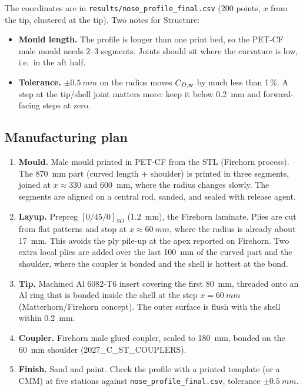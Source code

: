 The coordinates are in \texttt{results/nose\_profile\_final.csv} (200 points, $x$ from the tip,
clustered at the tip). Two notes for Structure:
\begin{itemize}[leftmargin=*,itemsep=2pt]
\item \textbf{Mould length.} The profile is longer than one print bed, so the PET-CF male mould
needs 2--3 segments. Joints should sit where the curvature is low, i.e.\ in the aft half.
\item \textbf{Tolerance.} $\pm\SI{0.5}{mm}$ on the radius moves $C_{D,\rm w}$ by much less than
1\,\%. A step at the tip/shell joint matters more: keep it below \SI{0.2}{mm} and forward-facing
steps at zero.
\end{itemize}

\subsection{Manufacturing plan}

\begin{enumerate}[leftmargin=*,itemsep=2pt]
\item \textbf{Mould.} Male mould printed in PET-CF from the STL (Firehorn process). The \SI{870}{mm}
part (curved length + shoulder) is printed in three segments, joined at $x \approx 330$ and
\SI{600}{mm}, where the radius changes slowly. The segments are aligned on a central rod,
sanded, and sealed with release agent.
\item \textbf{Layup.} Prepreg $[0/45/0]_{SO}$ (\SI{1.2}{mm}), the Firehorn laminate. Plies are cut
from flat patterns and stop at $x \approx \SI{60}{mm}$, where the radius is already
about \SI{17}{mm}. This avoids the ply pile-up at the apex reported on Firehorn. Two extra
local plies are added over the last \SI{100}{mm} of the curved part and the shoulder, where the
coupler is bonded and the shell is hottest at the bond.
\item \textbf{Tip.} Machined Al 6082-T6 insert covering the first \SI{80}{mm}, threaded onto an Al
ring that is bonded inside the shell at the step $x = \SI{60}{mm}$ (Matterhorn/Firehorn
concept). The outer surface is flush with the shell within \SI{0.2}{mm}.
\item \textbf{Coupler.} Firehorn male glued coupler, scaled to \SI{180}{mm}, bonded on the
\SI{60}{mm} shoulder (2027\_C\_ST\_COUPLERS).
\item \textbf{Finish.} Sand and paint. Check the profile with a printed template (or a CMM) at
five stations against \texttt{nose\_profile\_final.csv}, tolerance $\pm\SI{0.5}{mm}$.
\end{enumerate}

